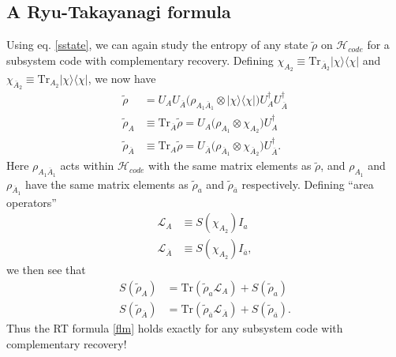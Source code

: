 \documentclass[12pt]{article}
\newcommand{\lan}{\langle}
\newcommand{\ran}{\rangle}
\newcommand{\Tr}{\mathrm{Tr}}
\newcommand{\wt}{\widetilde}
\newcommand{\Ll}{\mathcal{L}}
\newcommand{\Ab}{\ol{A}}
\newcommand{\ab}{\ol{a}}
\newcommand{\Hc}{\mathcal{H}_{code}}
\newcommand{\ol}{\overline}
\begin{document}
\subsection{A Ryu-Takayanagi formula}
Using eq. \eqref{sstate}, we can again study the entropy of any state $\wt{\rho}$ on $\Hc$ for a subsystem code with complementary recovery.  Defining $\chi_{A_2}\equiv \Tr_{\Ab_2}|\chi\ran\lan\chi|$ and $\chi_{\Ab_2}\equiv \Tr_{A_2}|\chi\ran\lan\chi|$, we now have  
\begin{align}
\wt{\rho}&=U_AU_{\Ab}\Big(\rho_{A_1\Ab_1}\otimes |\chi\ran\lan\chi|\Big)U_A^\dagger U_{\Ab}^\dagger\\\label{sra}
\wt{\rho}_A&\equiv \Tr_{\Ab} \wt{\rho}=U_A\Big(\rho_{A_1}\otimes \chi_{A_2}\Big)U_A^\dagger\\
\wt{\rho}_{\Ab}&\equiv \Tr_{A} \wt{\rho}=U_{\Ab}\Big(\rho_{\Ab_1}\otimes \chi_{\Ab_2}\Big)U_{\Ab}^\dagger.
\end{align}
Here $\rho_{A_1\Ab_1}$ acts within $\Hc$ with the same matrix elements as $\wt{\rho}$, and $\rho_{A_1}$ and $\rho_{\Ab_1}$ have the same matrix elements as $\wt{\rho}_a$ and $\wt{\rho}_{\ab}$ respectively.   Defining ``area operators'' 
\begin{align}
\Ll_A&\equiv  S(\chi_{A_2})I_a\\
\Ll_{\Ab}&\equiv S(\chi_{A_2})I_{\ab},
\end{align}
we then see that 
\begin{align}\label{sflm1}
S\left(\wt{\rho}_A\right)&=\Tr\left(\wt{\rho}_a \Ll_A\right)+S\left(\wt{\rho}_a\right)\\\label{sflm2}
S\left(\wt{\rho}_{\Ab}\right)&=\Tr\left(\wt{\rho}_{\ab} \Ll_{\Ab}\right)+S\left(\wt{\rho}_{\ab}\right).
\end{align}
Thus the RT formula \eqref{flm} holds exactly for any subsystem code with complementary recovery!
\end{document}
